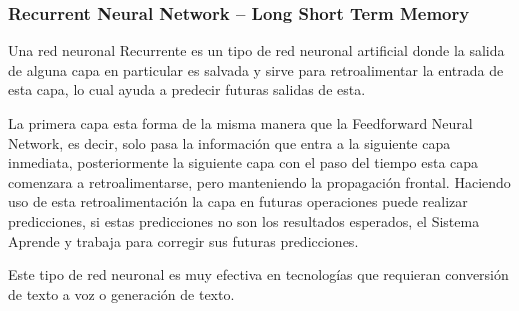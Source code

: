 \documentclass[12pt, a4paper, titlepage]{report}
\begin{document}
				\subsubsection{Recurrent Neural Network – Long Short Term Memory}
				Una red neuronal \Gls{Recurrente} es un tipo de red neuronal artificial donde la salida de alguna capa en particular es salvada y sirve para retroalimentar la entrada de esta capa, lo cual ayuda a predecir futuras salidas de esta.\par
				La primera capa esta forma de la misma manera que la Feedforward Neural Network, es decir, solo pasa la información que entra a la siguiente capa inmediata, posteriormente la siguiente capa con el paso del tiempo esta capa comenzara a retroalimentarse, pero manteniendo la propagación frontal. Haciendo uso de esta retroalimentación la capa en futuras operaciones puede realizar predicciones, si estas predicciones no son los resultados esperados, el \Gls{Sistema} \Gls{Aprende} y trabaja para corregir sus futuras predicciones.\cite{refTiposRedesNeu1}\par
				Este tipo de red neuronal es muy efectiva en tecnologías que requieran conversión de texto a voz o generación de texto.\par
\end{document}
